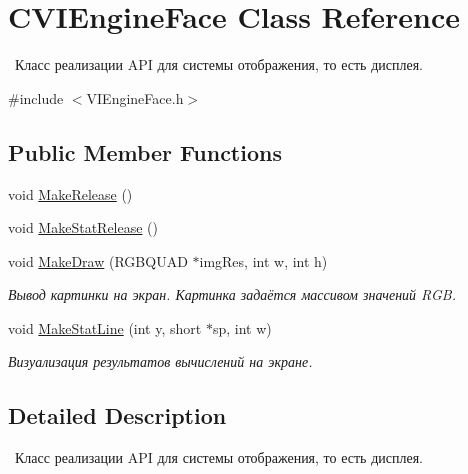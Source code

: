 \hypertarget{class_c_v_i_engine_face}{\section{C\+V\+I\+Engine\+Face Class Reference}
\label{class_c_v_i_engine_face}
}


 Класс реализации A\+P\+I для системы отображения, то есть дисплея.  




{\ttfamily \#include $<$V\+I\+Engine\+Face.\+h$>$}

\subsection*{Public Member Functions}
\begin{DoxyCompactItemize}
\item 
void \hyperlink{class_c_v_i_engine_face_a3f7751d47217c7c49853453934492747}{Make\+Release} ()
\item 
void \hyperlink{class_c_v_i_engine_face_ab571ed46f2a696d5bf7ad3a6b925fca9}{Make\+Stat\+Release} ()
\item 
void \hyperlink{class_c_v_i_engine_face_acefef57980dc5093ab36133795610d17}{Make\+Draw} (R\+G\+B\+Q\+U\+A\+D $\ast$img\+Res, int w, int h)
\begin{DoxyCompactList}\small\item\em Вывод картинки на экран. Картинка задаётся массивом значений R\+G\+B. \end{DoxyCompactList}\item 
void \hyperlink{class_c_v_i_engine_face_afe73d8803d96d4b9b9023d71ad98f7d3}{Make\+Stat\+Line} (int y, short $\ast$sp, int w)
\begin{DoxyCompactList}\small\item\em Визуализация результатов вычислений на экране. \end{DoxyCompactList}\end{DoxyCompactItemize}


\subsection{Detailed Description}
 Класс реализации A\+P\+I для системы отображения, то есть дисплея. 



